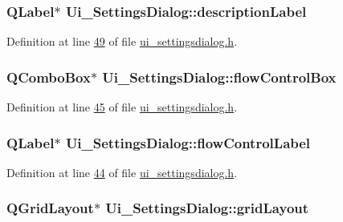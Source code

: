 \hypertarget{a00082_aaf2756662f744e79aa3443f1e035870d}{
\subsubsection[{description\+Label}]{\setlength{\rightskip}{0pt plus 5cm}Q\+Label$\ast$ Ui\+\_\+\+Settings\+Dialog\+::description\+Label}}\label{a00082_aaf2756662f744e79aa3443f1e035870d}


Definition at line \hyperlink{a00141_source_l00049}{49} of file \hyperlink{a00141_source}{ui\+\_\+settingsdialog.\+h}.

\hypertarget{a00082_a1ebdf5da704108eae1078cefc446fbef}{
\subsubsection[{flow\+Control\+Box}]{\setlength{\rightskip}{0pt plus 5cm}Q\+Combo\+Box$\ast$ Ui\+\_\+\+Settings\+Dialog\+::flow\+Control\+Box}}\label{a00082_a1ebdf5da704108eae1078cefc446fbef}


Definition at line \hyperlink{a00141_source_l00045}{45} of file \hyperlink{a00141_source}{ui\+\_\+settingsdialog.\+h}.

\hypertarget{a00082_a7876a6baf43bd21d3b816f6a5a24fffc}{
\subsubsection[{flow\+Control\+Label}]{\setlength{\rightskip}{0pt plus 5cm}Q\+Label$\ast$ Ui\+\_\+\+Settings\+Dialog\+::flow\+Control\+Label}}\label{a00082_a7876a6baf43bd21d3b816f6a5a24fffc}


Definition at line \hyperlink{a00141_source_l00044}{44} of file \hyperlink{a00141_source}{ui\+\_\+settingsdialog.\+h}.

\hypertarget{a00082_a07d152c7cc63e2cffdda613baea54c0f}{
\subsubsection[{grid\+Layout}]{\setlength{\rightskip}{0pt plus 5cm}Q\+Grid\+Layout$\ast$ Ui\+\_\+\+Settings\+Dialog\+::grid\+Layout}}\label{a00082_a07d152c7cc63e2cffdda613baea54c0f}



